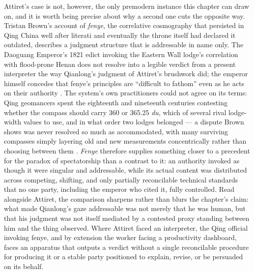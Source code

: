 \documentclass[10pt]{article}
\begin{document}
Attiret's case is not, however, the only premodern instance this chapter can draw on, and it is worth being precise about why a second one cuts the opposite way. Tristan Brown's account of \emph{fenye}, the correlative cosmography that persisted in Qing China well after literati and eventually the throne itself had declared it outdated, describes a judgment structure that is addressable in name only. The Daoguang Emperor's 1821 edict invoking the Eastern Wall lodge's correlation with flood-prone Henan does not resolve into a legible verdict from a present interpreter the way Qianlong's judgment of Attiret's brushwork did; the emperor himself concedes that fenye's principles are ``difficult to fathom'' even as he acts on their authority \cite{brown}. The system's own practitioners could not agree on its terms: Qing geomancers spent the eighteenth and nineteenth centuries contesting whether the compass should carry 360 or 365.25 \emph{du}, which of several rival lodge-width values to use, and in what order two lodges belonged --- a dispute Brown shows was never resolved so much as accommodated, with many surviving compasses simply layering old and new measurements concentrically rather than choosing between them \cite{brown}. \emph{Fenye} therefore supplies something closer to a precedent for the paradox of spectatorship than a contrast to it: an authority invoked as though it were singular and addressable, while its actual content was distributed across competing, shifting, and only partially reconcilable technical standards that no one party, including the emperor who cited it, fully controlled. Read alongside Attiret, the comparison sharpens rather than blurs the chapter's claim: what made Qianlong's gaze addressable was not merely that he was human, but that his judgment was not itself mediated by a contested proxy standing between him and the thing observed. Where Attiret faced an interpreter, the Qing official invoking fenye, and by extension the worker facing a productivity dashboard, faces an apparatus that outputs a verdict without a single reconcilable procedure for producing it or a stable party positioned to explain, revise, or be persuaded on its behalf.
\end{document}
